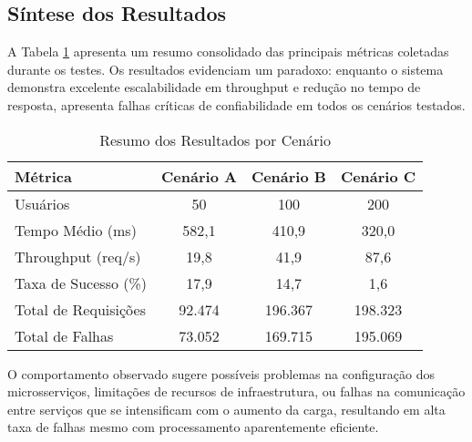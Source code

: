 \documentclass[conference]{IEEEtran}
\begin{document}
    \subsection{Síntese dos Resultados}

    A Tabela \ref{tab:resultados} apresenta um resumo consolidado das principais
    métricas coletadas durante os testes. Os resultados evidenciam um paradoxo:
    enquanto o sistema demonstra excelente escalabilidade em throughput e
    redução no tempo de resposta, apresenta falhas críticas de confiabilidade em
    todos os cenários testados.

    \begin{table}[htbp]
        \caption{Resumo dos Resultados por Cenário}
        \begin{center}
            \begin{tabular}{|l|c|c|c|}
                \hline
                \textbf{Métrica}     & \textbf{Cenário A} & \textbf{Cenário B} & \textbf{Cenário C} \\
                \hline
                Usuários             & 50                 & 100                & 200                \\
                \hline
                Tempo Médio (ms)     & 582,1              & 410,9              & 320,0              \\
                \hline
                Throughput (req/s)   & 19,8               & 41,9               & 87,6               \\
                \hline
                Taxa de Sucesso (\%) & 17,9               & 14,7               & 1,6                \\
                \hline
                Total de Requisições & 92.474             & 196.367            & 198.323            \\
                \hline
                Total de Falhas      & 73.052             & 169.715            & 195.069            \\
                \hline
            \end{tabular}
            \label{tab:resultados}
        \end{center}
    \end{table}

    O comportamento observado sugere possíveis problemas na configuração dos
    microsserviços, limitações de recursos de infraestrutura, ou falhas na
    comunicação entre serviços que se intensificam com o aumento da carga, resultando
    em alta taxa de falhas mesmo com processamento aparentemente eficiente.
\end{document}

